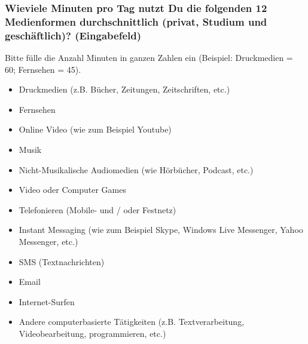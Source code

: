 \subsubsection*{Wieviele Minuten pro Tag nutzt Du die folgenden 12 Medienformen durchschnittlich (privat, Studium und geschäftlich)? (Eingabefeld)}
Bitte fülle die Anzahl Minuten in ganzen Zahlen ein (Beispiel: Druckmedien = 60; Fernsehen = 45).
    \begin{itemize}
      \item Druckmedien (z.B. Bücher, Zeitungen, Zeitschriften, etc.)
      \item Fernsehen
      \item Online Video (wie zum Beispiel Youtube)
      \item Musik
      \item Nicht-Musikalische Audiomedien (wie Hörbücher, Podcast, etc.)
      \item Video oder Computer Games
      \item Telefonieren (Mobile- und / oder Festnetz)
      \item Instant Messaging (wie zum Beispiel Skype, Windows Live Messenger, Yahoo Messenger, etc.)
      \item SMS (Textnachrichten)
      \item Email
      \item Internet-Surfen
      \item Andere computerbasierte Tätigkeiten (z.B. Textverarbeitung, Videobearbeitung, programmieren, etc.)
    \end{itemize} 
